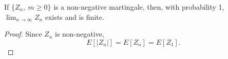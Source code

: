 \documentclass[a4paper,10pt,english]{article}
\begin{document}
\begin{cor}
If $\{Z_n,~m \geq 0\}$ is a non-negative martingale, then, with probability 1, $\lim_{n \rightarrow \infty}Z_n$ exists and is finite.
\end{cor}
\begin{proof}
Since $Z_n$ is non-negative,
\begin{equation*}
E[|Z_n|]=E[Z_n]=E[Z_1].
\end{equation*}
\end{proof}
\end{document}
